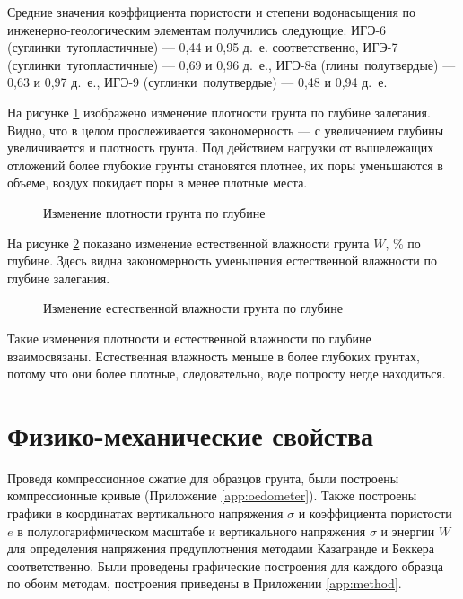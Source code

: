 Средние значения коэффициента пористости и 
степени водонасыщения по инженерно-геологическим 
элементам получились следующие:
ИГЭ-6 (суглинки тугопластичные) --- 0,44 и 0,95 д.~е. соответственно, 
ИГЭ-7 (суглинки тугопластичные) --- 0,69 и 0,96 д.~е., 
ИГЭ-8а (глины полутвердые) --- 0,63 и 0,97 д.~е., 
ИГЭ-9 (суглинки полутвердые) --- 0,48 и 0,94 д.~е.

На рисунке \ref{fig:plgl} изображено изменение плотности 
грунта по глубине залегания. Видно, что в целом прослеживается 
закономерность --- с увеличением глубины увеличивается и 
плотность грунта. Под действием нагрузки от вышележащих 
отложений более глубокие грунты становятся плотнее, 
их поры уменьшаются в объеме, воздух покидает поры 
в менее плотные места.

\begin{figure}[ht]
  \caption{Изменение плотности грунта по глубине}\label{fig:plgl}
\end{figure}

На рисунке \ref{fig:vlgl} показано изменение 
естественной влажности грунта $W$, \% по глубине.
Здесь видна закономерность уменьшения естественной 
влажности по глубине залегания.

\begin{figure}[ht]
  \caption{Изменение естественной влажности грунта по глубине}\label{fig:vlgl}
\end{figure}

Такие изменения плотности и естественной влажности 
по глубине взаимосвязаны. Естественная влажность 
меньше в более глубоких грунтах, потому что 
они более плотные, следовательно, воде 
попросту негде находиться.

\section{Физико-механические свойства}

Проведя компрессионное сжатие для образцов грунта, были построены
компрессионные кривые (Приложение \ref{app:oedometer}).
Также построены графики в координатах вертикального 
напряжения $\sigma$ и коэффициента пористости $e$ 
в полулогарифмическом масштабе и вертикального напряжения $\sigma$ 
и энергии $W$ для определения напряжения предуплотнения 
методами Казагранде и Беккера соответственно. Были проведены 
графические построения для каждого образца по обоим 
методам, построения приведены в Приложении \ref{app:method}.

